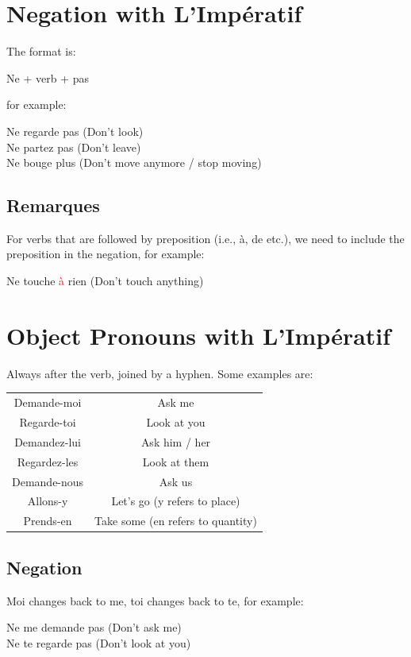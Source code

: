 \documentclass{book}
\begin{document}
\section{Negation with L'Impératif}
The format is:
\begin{center}
    Ne + verb + pas
\end{center}
for example:
\begin{center}
    Ne regarde pas (Don't look) \\
    Ne partez pas (Don't leave) \\
    Ne bouge plus (Don't move anymore / stop moving)
\end{center}

\subsection{Remarques}
For verbs that are followed by preposition (i.e., à, de etc.), we need to include the preposition in the negation, for example:
\begin{center}
    Ne touche \textcolor{red}{à} rien (Don't touch anything)
\end{center}

\section{Object Pronouns with L'Impératif}
Always after the verb, joined by a hyphen. Some examples are:
\begin{center}
    \begin{tabular}{|c|c|}
        \hline
        Demande-moi & Ask me \\
        Regarde-toi & Look at you \\
        Demandez-lui & Ask him / her \\
        Regardez-les & Look at them \\
        Demande-nous & Ask us \\
        Allons-y & Let's go (y refers to place) \\
        Prends-en & Take some (en refers to quantity) \\
        \hline
    \end{tabular}
\end{center}

\subsection{Negation}
Moi changes back to me, toi changes back to te, for example:
\begin{center}
    Ne me demande pas (Don't ask me) \\
    Ne te regarde pas (Don't look at you)
\end{center}
\end{document}
